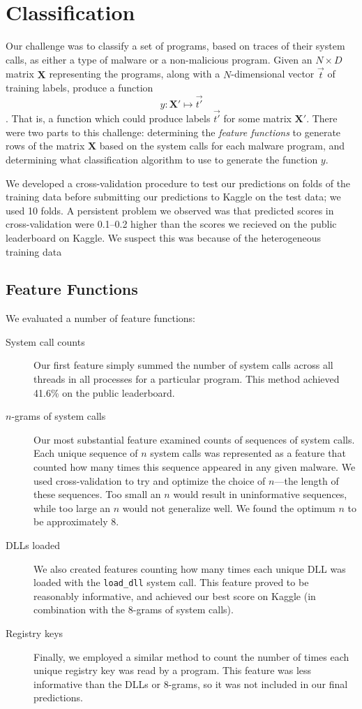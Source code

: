 \documentclass[11pt]{amsart}
\newcommand{\mat}[1]{\mathbf{#1}}
\begin{document}
\section{Classification}

Our challenge was to classify a set of programs, based on traces of their system calls, as either a type of malware or a non-malicious program. Given an $N \times D$ matrix $\mat{X}$ representing the programs, along with a $N$-dimensional vector $\vec{t}$ of training labels, produce a function 
$$y : \mat{X'} \mapsto \vec{t'}$$.
That is, a function which could produce labels $\vec{t'}$ for some matrix $\mat{X'}$. There were two parts to this challenge: determining the \emph{feature functions} to generate rows of the matrix $\mat{X}$ based on the system calls for each malware program, and determining what classification algorithm to use to generate the function $y$.

We developed a cross-validation procedure to test our predictions on folds of the training data before submitting our predictions to Kaggle on the test data; we used 10 folds. A persistent problem we observed was that predicted scores in cross-validation were 0.1--0.2 higher than the scores we recieved on the public leaderboard on Kaggle. We suspect this was because of the heterogeneous training data 

\subsection{Feature Functions}

We evaluated a number of feature functions:
\begin{description}
  \item[System call counts] Our first feature simply summed the number of system calls across all threads in all processes for a particular program. This method achieved 41.6\%  on the public leaderboard.
  \item[$n$-grams of system calls] Our most substantial feature examined counts of sequences of system calls. Each unique sequence of $n$ system calls was represented as a feature that counted how many times this sequence appeared in any given malware. We used cross-validation to try and optimize the choice of $n$---the length of these sequences. Too small an $n$ would result in uninformative sequences, while too large an $n$ would not generalize well. We found the optimum $n$ to be approximately 8. 
  \item[DLLs loaded] We also created features counting how many times each unique DLL was loaded with the \verb|load_dll| system call. This feature proved to be reasonably informative, and achieved our best score on Kaggle (in combination with the 8-grams of system calls). 
  \item[Registry keys] Finally, we employed a similar method to count the number of times each unique registry key was read by a program. This feature was less informative than the DLLs or 8-grams, so it was not included in our final predictions.
\end{description}
\end{document}
